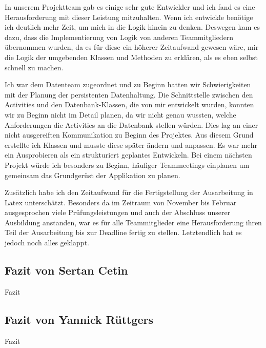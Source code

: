 In unserem Projektteam gab es einige sehr gute Entwickler und ich fand es eine Herausforderung mit dieser Leistung mitzuhalten. Wenn ich entwickle benötige ich deutlich mehr Zeit, um mich in die Logik hinein zu denken. Deswegen kam es dazu, dass die Implementierung von Logik von anderen Teammitgliedern übernommen wurden, da es für diese ein höherer Zeitaufwand gewesen wäre, mir die Logik der umgebenden Klassen und Methoden zu erklären, als es eben selbst schnell zu machen.

Ich war dem Datenteam zugeordnet und zu Beginn hatten wir Schwierigkeiten mit der Planung der persistenten Datenhaltung. Die Schnittstelle zwischen den Activities und den Datenbank-Klassen, die von mir entwickelt wurden, konnten wir zu Beginn nicht im Detail planen, da wir nicht genau wussten, welche Anforderungen die Activities an die Datenbank stellen würden. Dies lag an einer nicht ausgereiften Kommunikation zu Beginn des Projektes. Aus diesem Grund erstellte ich Klassen und musste diese später ändern und anpassen. Es war mehr ein Ausprobieren als ein strukturiert geplantes Entwickeln. Bei einem nächsten Projekt würde ich besonders zu Beginn, häufiger Teammeetings einplanen um gemeinsam das Grundgerüst der Applikation zu planen.

Zusätzlich habe ich den Zeitaufwand für die Fertigstellung der Ausarbeitung in Latex unterschätzt. Besonders da im Zeitraum von November bis Februar ausgesprochen viele Prüfungsleistungen und auch der Abschluss unserer Ausbildung anstanden, war es für alle Teammitglieder eine Herausforderung ihren Teil der Ausarbeitung bis zur Deadline fertig zu stellen. Letztendlich hat es jedoch noch alles geklappt.


\subsection{Fazit von Sertan Cetin}

Fazit

\subsection{Fazit von Yannick Rüttgers}

Fazit


